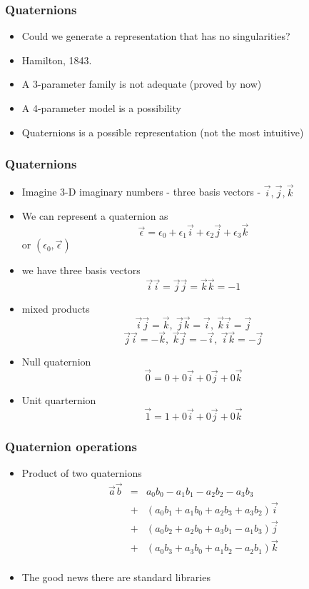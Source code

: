 \documentclass[10pt]{beamer}
\begin{document}
\begin{frame}
  \frametitle{Quaternions}
  \begin{itemize}
  \item Could we generate a representation that has no singularities?
  \item Hamilton, 1843. 
  \item A 3-parameter family is not adequate (proved by now)
  \item A 4-parameter model is a possibility
  \item Quaternions is a possible representation (not the most intuitive)
  \end{itemize}
\end{frame}

\begin{frame}
  \frametitle{Quaternions}
  \begin{itemize}
  \item Imagine 3-D imaginary numbers - three basis vectors - $\vec{i}, \vec{j}, \vec{k}$
  \item We can represent a quaternion as
    \[
      \vec{\epsilon} = \epsilon_0 + \epsilon_1 \vec{i} + \epsilon_2 \vec{j} + \epsilon_3 \vec{k}
    \]
    or $(\epsilon_0,\vec{\epsilon})$
    \pause
  \item we have three basis vectors
    \[ \vec{i}\vec{i} = \vec{j}\vec{j} = \vec{k}\vec{k} = -1 \]
  \item mixed products
    \[ \vec{i}\vec{j}=\vec{k}, ~ \vec{j}\vec{k} = \vec{i}, ~ \vec{k}\vec{i} = \vec{j}
    \]
    \[
      \vec{j}\vec{i} = -\vec{k}, ~ \vec{k}\vec{j} = -\vec{i}, ~ \vec{i}\vec{k} = -\vec{j}
    \]
  \item Null quaternion
    \[ \vec{0} = 0 + 0\vec{i} + 0 \vec{j} + 0 \vec{k} \]
  \item Unit quarternion
    \[ \vec{1} = 1 + 0 \vec{i} + 0 \vec{j} + 0 \vec{k} \]
  \end{itemize}
\end{frame}

\begin{frame}
  \frametitle{Quaternion operations}
  \begin{itemize}
  \item Product of two quaternions
    \[
      \begin{array}{ccc}
        \vec{a}\vec{b} & = & a_0 b_0 - a_1 b_1-a_2 b_2-a_3 b_3\\
                       & +  & (a_0 b_1 + a_1 b_0 + a_2 b_3 + a_3 b_2 ) \vec{i} \\
                       & +  & (a_0 b_2 + a_2 b_0 + a_3 b_1 - a_1 b_3) \vec{j} \\
                       & +  & (a_0 b_3 + a_3 b_0 + a_1 b_2 - a_2 b_1) \vec{k} \\
      \end{array}
    \]
  \item The good news there are standard libraries
  \end{itemize}
\end{frame}
\end{document}
